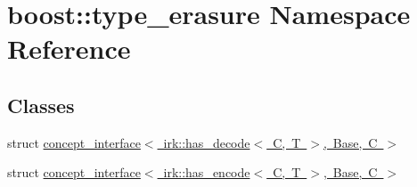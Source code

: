 \hypertarget{namespaceboost_1_1type__erasure}{}\section{boost\+:\+:type\+\_\+erasure Namespace Reference}
\label{namespaceboost_1_1type__erasure}
\subsection*{Classes}
\begin{DoxyCompactItemize}
\item 
struct \mbox{\hyperlink{structboost_1_1type__erasure_1_1concept__interface_3_01irk_1_1has__decode_3_01C_00_01T_01_4_00_01Base_00_01C_01_4}{concept\+\_\+interface$<$ irk\+::has\+\_\+decode$<$ C, T $>$, Base, C $>$}}
\item 
struct \mbox{\hyperlink{structboost_1_1type__erasure_1_1concept__interface_3_01irk_1_1has__encode_3_01C_00_01T_01_4_00_01Base_00_01C_01_4}{concept\+\_\+interface$<$ irk\+::has\+\_\+encode$<$ C, T $>$, Base, C $>$}}
\end{DoxyCompactItemize}
